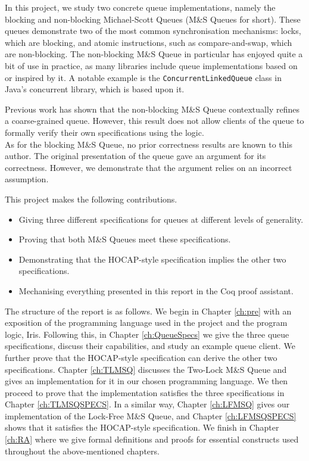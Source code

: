 \documentclass[a4paper, 10pt]{report}
\theoremstyle{definition}
\newcommand{\msq}{M\&S Queue}
\newcommand{\tlmsq}{Two-Lock \msq{}}
\newcommand{\lfmsq}{Lock-Free \msq{}}
\begin{document}
In this project, we study two concrete queue implementations, namely the blocking and non-blocking Michael-Scott Queues (\msq{}s for short). These queues demonstrate two of the most common synchronisation mechanisms: locks, which are blocking, and atomic instructions, such as compare-and-swap, which are non-blocking. The non-blocking \msq{} in particular has enjoyed quite a bit of use in practice, as many libraries include queue implementations based on or inspired by it. A notable example is the \texttt{ConcurrentLinkedQueue} class in Java's concurrent library, which is based upon it.

Previous work \citep{DBLP:conf/cpp/VindumB21} has shown that the non-blocking \msq{} contextually refines a coarse-grained queue. However, this result does not allow clients of the queue to formally verify their own specifications using the logic.\\
As for the blocking \msq{}, no prior correctness results are known to this author. The original presentation of the queue \citep{DBLP:conf/podc/MichaelS96} gave an argument for its correctness. However, we demonstrate that the argument relies on an incorrect assumption.

This project makes the following contributions.
\begin{itemize}
  \item Giving three different specifications for queues at different levels of generality.
  \item Proving that both \msq{}s meet these specifications.
  \item Demonstrating that the HOCAP-style specification implies the other two specifications.
  \item Mechanising everything presented in this report in the Coq proof assistant.
\end{itemize}

The structure of the report is as follows. We begin in Chapter \ref{ch:pre} with an exposition of the programming language used in the project and the program logic, Iris. Following this, in Chapter \ref{ch:QueueSpecs} we give the three queue specifications, discuss their capabilities, and study an example queue client. We further prove that the HOCAP-style specification can derive the other two specifications. Chapter \ref{ch:TLMSQ} discusses the \tlmsq{} and gives an implementation for it in our chosen programming language. We then proceed to prove that the implementation satisfies the three specifications in Chapter \ref{ch:TLMSQSPECS}. In a similar way, Chapter \ref{ch:LFMSQ} gives our implementation of the \lfmsq{}, and Chapter \ref{ch:LFMSQSPECS} shows that it satisfies the HOCAP-style specification. We finish in Chapter \ref{ch:RA} where we give formal definitions and proofs for essential constructs used throughout the above-mentioned chapters.
\end{document}
